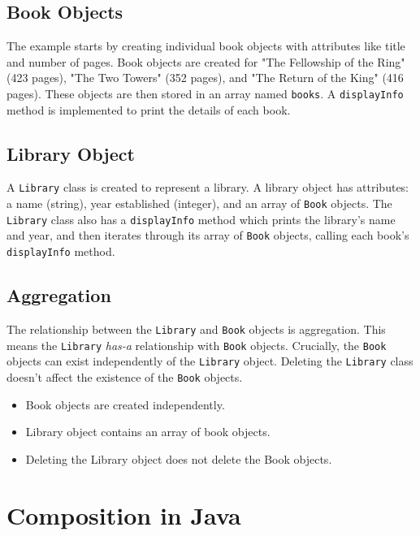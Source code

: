\documentclass{article}
\begin{document}
\subsection{Book Objects}

The example starts by creating individual book objects with attributes like title and number of pages.  Book objects are created for "The Fellowship of the Ring" (423 pages), "The Two Towers" (352 pages), and "The Return of the King" (416 pages). These objects are then stored in an array named \texttt{books}.  A \texttt{displayInfo} method is implemented to print the details of each book.

\subsection{Library Object}

A \texttt{Library} class is created to represent a library.  A library object has attributes: a name (string), year established (integer), and an array of \texttt{Book} objects.  The \texttt{Library} class also has a \texttt{displayInfo} method which prints the library's name and year, and then iterates through its array of \texttt{Book} objects, calling each book's \texttt{displayInfo} method.

\subsection{Aggregation}

The relationship between the \texttt{Library} and \texttt{Book} objects is aggregation. This means the \texttt{Library} \textit{has-a} relationship with \texttt{Book} objects.  Crucially, the \texttt{Book} objects can exist independently of the \texttt{Library} object.  Deleting the \texttt{Library} class doesn't affect the existence of the \texttt{Book} objects.

\begin{itemize}
    \item Book objects are created independently.
    \item Library object contains an array of book objects.
    \item Deleting the Library object does not delete the Book objects.
\end{itemize}


\section{Composition in Java}
\end{document}

